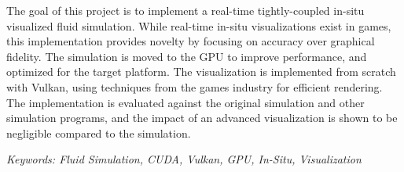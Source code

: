 The goal of this project is to implement a 
real-time tightly-coupled in-situ visualized fluid simulation.
While real-time in-situ visualizations exist in games, this implementation provides novelty by focusing on accuracy over graphical fidelity.
The simulation is moved to the GPU to improve performance, and optimized for the target platform.
The visualization is implemented from scratch with Vulkan, using techniques from the games industry for efficient rendering.
The implementation is evaluated against the original simulation and other simulation programs, and the impact of an advanced visualization is shown to be negligible compared to the simulation.

\vspace{0.5cm}

\noindent \textit{Keywords: Fluid Simulation, CUDA, Vulkan, GPU, In-Situ, Visualization}